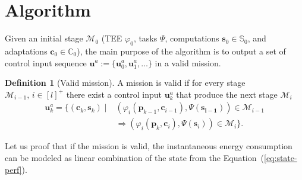 \documentclass[letterpaper,10pt,conference]{ieeeconf}
\theoremstyle{definition}
\newtheorem{defn}{Definition}[section]
\begin{document}
\section{Algorithm}
\label{sec:algo}

Given an initial stage $\mathcal{M}_0$ (TEE $\varphi_0$, tasks $\Psi$, computations $\mathbf{s}_0\in\mathbb{S}_0$, and adaptations $\mathbf{c}_0\in\mathbb{C}_0$), the main purpose of the algorithm is to output a set of control input sequence $\mathbf{u}^a:=\{\mathbf{u}_0^a,\mathbf{u}_1^a,\dots\}$ in a valid mission.

\begin{defn}[Valid mission]\label{def:valid}
  A mission is valid if for every stage $\mathcal{M}_{i-1},\,i\in[l]^+$ there exist a control input $\mathbf{u}_k^{a}$ that produce the next stage $\mathcal{M}_i$
  \begin{equation}\begin{split}
    \mathbf{u}^a_{k}=\{(\mathbf{c}_{k},\mathbf{s}_{k})\mid&(\varphi_i(\mathbf{p}_{k-1},\mathbf{c}_{i-1}),\Psi(\mathbf{s_{i-1}}))\in\mathcal{M}_{i-1}\\
    &\Longrightarrow(\varphi_i(\mathbf{p}_{k},\mathbf{c}_{i}),\Psi(\mathbf{s}_{i}))\in\mathcal{M}_{i}\}.
  \end{split}\end{equation}
\end{defn}

Let us proof that if the mission is valid, the instantaneous energy consumption can be modeled as linear combination of the state from the Equation~(\ref{eq:state-perf}).
\end{document}
